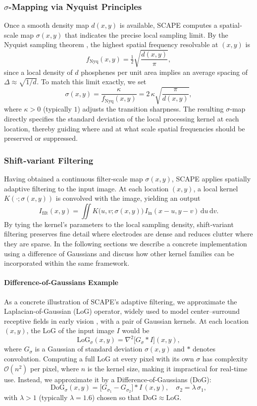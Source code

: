 \subsubsection{\(\sigma\)-Mapping via Nyquist Principles}
Once a smooth density map \(d(x,y)\) is available, SCAPE computes a spatial‐scale map \(\sigma(x,y)\) that indicates the precise local sampling limit. By the Nyquist sampling theorem \cite{Nyquist1928}, the highest spatial frequency resolvable at \((x,y)\) is
\[
f_{\mathrm{Nyq}}(x,y)
=\tfrac{1}{2}\sqrt{\frac{d(x,y)}{\pi}},
\]
since a local density of \(d\) phosphenes per unit area implies an average spacing of \(\Delta\approx\sqrt{1/d}\).  To match this limit exactly, we set
\[
\sigma(x,y)
= \frac{\kappa}{f_{\mathrm{Nyq}}(x,y)}
= 2\,\kappa\sqrt{\frac{\pi}{d(x,y)}},
\]
where \(\kappa>0\) (typically \(1\)) adjusts the transition sharpness.  The resulting \(\sigma\)-map directly specifies the standard deviation of the local processing kernel at each location, thereby guiding where and at what scale spatial frequencies should be preserved or suppressed.



\subsubsection{Shift-variant Filtering}
Having obtained a continuous filter‐scale map \(\sigma(x,y)\), SCAPE applies spatially adaptive filtering to the input image. At each location \((x,y)\), a local kernel \(K(\cdot;\sigma(x,y))\) is convolved with the image, yielding an output
\[
I_{\mathrm{filt}}(x,y)
=\iint K\bigl(u,v;\sigma(x,y)\bigr)\,
I_{\mathrm{in}}(x-u,y-v)\,\mathrm{d}u\,\mathrm{d}v.
\]
By tying the kernel’s parameters to the local sampling density, shift‐variant filtering preserves fine detail where electrodes are dense and reduces clutter where they are sparse. In the following sections we describe a concrete implementation using a difference of Gaussians and discuss how other kernel families can be incorporated within the same framework.


\paragraph{Difference-of-Gaussians Example}
As a concrete illustration of SCAPE’s adaptive filtering, we approximate the Laplacian-of-Gaussian (LoG) operator, widely used to model center–surround receptive fields in early vision \cite{Young1987}, with a pair of Gaussian kernels.  At each location \((x,y)\), the LoG of the input image \(I\) would be
\[
\mathrm{LoG}_{\sigma}(x,y)
=\nabla^2\bigl[G_{\sigma} * I\bigr](x,y),
\]
where \(G_{\sigma}\) is a Gaussian of standard deviation \(\sigma(x,y)\) and \(*\) denotes convolution.  Computing a full LoG at every pixel with its own \(\sigma\) has complexity \(\mathcal{O}(n^2)\) per pixel, where \(n\) is the kernel size, making it impractical for real-time use.  Instead, we approximate it by a Difference-of-Gaussians (DoG):
\[
\mathrm{DoG}_{\sigma}(x,y)
=\bigl[G_{\sigma_1} - G_{\sigma_2}\bigr] * I\,(x,y),
\quad \sigma_2 = \lambda\,\sigma_1,
\]
with \(\lambda>1\) (typically \(\lambda=1.6\)) chosen so that \(\mathrm{DoG}\approx\mathrm{LoG}\).

